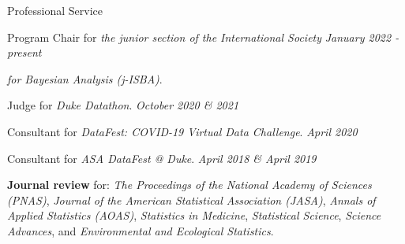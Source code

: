 \documentclass{resume} %
\begin{document}
\begin{rSection}{Professional Service}


Program Chair for \emph{the junior section of the International Society} \hfill {\em January 2022 - present}

\vspace{-0.1in}
\emph{for Bayesian Analysis (j-ISBA)}.

\smallskip



Judge for \emph{Duke Datathon}.  \hfill {\em October 2020 \& 2021}







\smallskip

Consultant for \emph{DataFest: COVID-19 Virtual Data Challenge}.  \hfill {\em April 2020}



\smallskip

Consultant for \emph{ASA DataFest @ Duke}. \hfill {\em April 2018 \& April 2019}

\smallskip

\textbf{Journal review} for: \emph{The Proceedings of the National Academy of Sciences (PNAS)}, \emph{Journal of the American Statistical Association (JASA)},  \emph{Annals of Applied Statistics (AOAS)}, \emph{Statistics in Medicine}, \emph{Statistical Science},  \emph{Science Advances}, and \emph{Environmental and Ecological Statistics}. 

\end{rSection}


\end{document}
